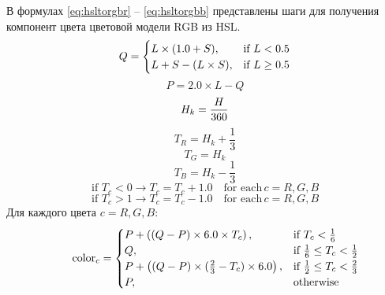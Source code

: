 \documentclass[a4paper,14pt, unknownkeysallowed]{extreport}
\begin{document}
    В формулах \ref{eq:hsltorgbr} -- \ref{eq:hsltorgbb} представлены шаги для получения компонент цвета цветовой модели RGB из HSL.
    \begin{equation}
        {\label{eq:hsltorgbr}\displaystyle Q={\begin{cases}L\times (1.0+S),&{\mbox{if }}L<0.5\\L+S-(L\times S),&{\mbox{if }}L\geq 0.5\end{cases}}}
    \end{equation}
    \begin{equation}
        {\displaystyle P=2.0\times L-Q}
    \end{equation}
    \begin{equation}
        {\displaystyle H_{k}={H \over 360}}
    \end{equation}
    \begin{equation}
        {\displaystyle T_{R}=H_{k}+{\frac {1}{3}}}
    \end{equation}
    \begin{equation}
        {\displaystyle T_{G}=H_{k}}
    \end{equation}
    \begin{equation}
        {\displaystyle T_{B}=H_{k}-{\frac {1}{3}}}
    \end{equation}
    \begin{equation}
        {\displaystyle {\mbox{if }}T_{c}<0\rightarrow T_{c}=T_{c}+1.0\quad {\mbox{for each}}\,c=R,G,B}
    \end{equation}
    \begin{equation}
        {\displaystyle {\mbox{if }}T_{c}>1\rightarrow T_{c}=T_{c}-1.0\quad {\mbox{for each}}\,c=R,G,B}
    \end{equation}
    Для каждого цвета $c = R,G,B$:
    \begin{equation}
        {\label{eq:hsltorgbb}\displaystyle \qquad \mathrm {color} _{c}={\begin{cases}P+\left((Q-P)\times 6.0\times T_{c}\right),&{\mbox{if }}T_{c}<{\frac {1}{6}}\\Q,&{\mbox{if }}{\frac {1}{6}}\leq T_{c}<{\frac {1}{2}}\\P+\left((Q-P)\times ({\frac {2}{3}}-T_{c})\times 6.0\right),&{\mbox{if }}{\frac {1}{2}}\leq T_{c}<{\frac {2}{3}}\\P,&{\mbox{otherwise }}\end{cases}}}
    \end{equation}
\end{document}
